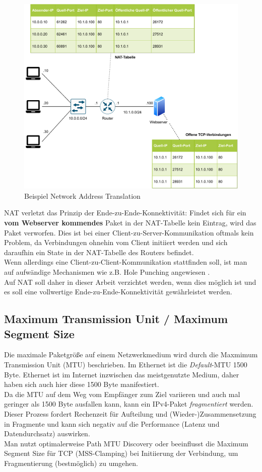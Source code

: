 \begin{figure}[h]
  \centering
  \includegraphics[scale=0.90]{Figures/napt.pdf}
  \caption{Beispiel Network Address Translation}
  \label{grafik: napt}
\end{figure}\FloatBarrier

NAT\label{nat-bad} verletzt das Prinzip der Ende-zu-Ende-Konnektivität: Findet sich für ein \textbf{vom Webserver kommendes} Paket in der NAT-Tabelle kein Eintrag, wird das Paket verworfen. Dies ist bei einer Client-zu-Server-Kommunikation oftmals kein Problem, da Verbindungen ohnehin vom Client initiiert werden und sich daraufhin ein State in der NAT-Tabelle des Routers befindet.\\
Wenn allerdings eine Client-zu-Client-Kommunikation stattfinden soll, ist man auf aufwändige Mechanismen wie z.B. Hole Punching angewiesen \cite[S.317]{Fall2011}.\\
Auf NAT soll daher in dieser Arbeit verzichtet werden, wenn dies möglich ist und es soll eine vollwertige Ende-zu-Ende-Konnektivität gewährleistet werden.

\subsection{Maximum Transmission Unit / Maximum Segment Size}\label{mtumss}
Die maximale Paketgröße auf einem Netzwerkmedium wird durch die Maxmimum Transmission Unit (MTU) beschrieben. Im Ethernet ist die \textit{Default}-MTU 1500 Byte.\cite[S.86]{Fall2011} Ethernet ist im Internet inzwischen das meistgenutzte Medium, daher haben sich auch hier diese 1500 Byte manifestiert.\\
Da die MTU auf dem Weg vom Empfänger zum Ziel variieren und auch mal geringer als 1500 Byte ausfallen kann, kann ein IPv4-Paket \textit{fragmentiert} werden. Dieser Prozess fordert Rechenzeit für Aufteilung und (Wieder-)Zusammensetzung in Fragmente und kann sich negativ auf die Performance (Latenz und Datendurchsatz) auswirken.\\
Man nutzt optimalerweise Path MTU Discovery oder beeinflusst die Maximum Segment Size für TCP (\glqq MSS-Clamping\grqq{}) bei Initiierung der Verbindung, um Fragmentierung (bestmöglich) zu umgehen.

